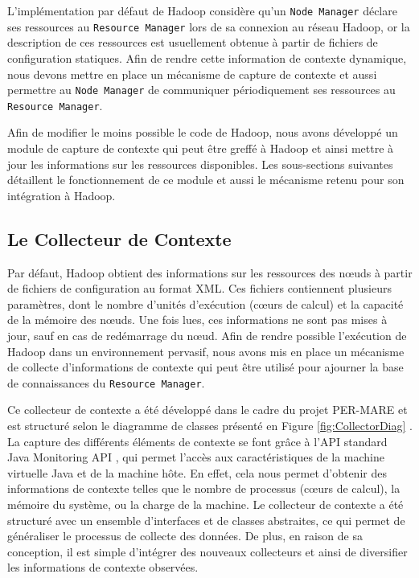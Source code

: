 L'implémentation par défaut de Hadoop considère qu'un \texttt{Node Manager} déclare ses ressources au \texttt{Resource Manager} lors de sa connexion au réseau Hadoop, or la description de ces ressources est usuellement obtenue à partir de fichiers de configuration statiques. Afin de rendre cette information de contexte dynamique, nous devons mettre en place un mécanisme de capture de contexte et aussi permettre au \texttt{Node Manager} de communiquer périodiquement ses ressources au \texttt{Resource Manager}. 

Afin de modifier le moins possible le code de Hadoop, nous avons développé un module de capture de contexte qui peut être greffé à Hadoop et ainsi mettre à jour les informations sur les ressources disponibles. Les sous-sections suivantes détaillent le fonctionnement de ce module et aussi le mécanisme retenu pour son intégration à Hadoop.

\subsection{Le Collecteur de Contexte\label{sec:gestionnairecontexte}}
Par défaut, Hadoop obtient des informations sur les ressources des n{\oe}uds à partir de fichiers de configuration au format XML. Ces fichiers contiennent plusieurs paramètres, dont le nombre d'unités d'exécution (c{\oe}urs de calcul) et la capacité de la mémoire des n{\oe}uds. Une fois lues, ces informations ne sont pas mises à jour, sauf en cas de redémarrage du n{\oe}ud. Afin de rendre possible l'exécution de Hadoop dans un environnement pervasif, nous avons mis en place un mécanisme de collecte d'informations de contexte qui peut être utilisé pour ajourner la base de connaissances du \texttt{Resource Manager}.

Ce collecteur de contexte a été développé dans le cadre du projet PER-MARE\cite{PER-MARE} et est structuré selon le diagramme de classes présenté en Figure \ref{fig:CollectorDiag} \cite{UBICOMM2014}. La capture des différents éléments de contexte se font grâce à l'API standard Java Monitoring API \cite{Oracle}, qui permet l'accès aux caractéristiques de la machine virtuelle Java et de la machine hôte. En effet, cela nous permet d'obtenir des informations de contexte telles que le nombre de processus (c{\oe}urs de calcul), la mémoire du système, ou la charge de la machine. Le collecteur de contexte a été structuré avec un ensemble d'interfaces et de classes abstraites, ce qui permet de généraliser le processus de collecte des données. De plus, en raison de sa conception, il est simple d'intégrer des nouveaux collecteurs et ainsi de diversifier les informations de contexte observées.

